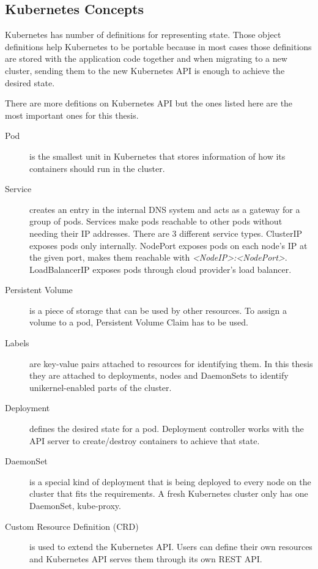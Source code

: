 \subsection*{Kubernetes Concepts}
Kubernetes has number of definitions for representing state. Those object definitions help Kubernetes to be portable because in most cases those definitions are stored with the application code together and when migrating to a new cluster, sending them to the new Kubernetes API is enough to achieve the desired state. 

There are more defitions on Kubernetes API but the ones listed here are the most important ones for this thesis.

\begin{description}
  \item [Pod] is the smallest unit in Kubernetes that stores information of how its containers should run in the cluster.
  \item [Service] creates an entry in the internal DNS system and acts as a gateway for a group of pods. Services make pods reachable to other pods without needing their IP addresses. There are 3 different service types. ClusterIP exposes pods only internally. NodePort exposes pods on each node's IP at the given port, makes them reachable with \textit{<NodeIP>:<NodePort>}. LoadBalancerIP exposes pods through cloud provider's load balancer.
  \item [Persistent Volume] is a piece of storage that can be used by other resources. To assign a volume to a pod, Persistent Volume Claim has to be used.
  \item [Labels] are key-value pairs attached to resources for identifying them. In this thesis they are attached to deployments, nodes and DaemonSets to identify unikernel-enabled parts of the cluster.
  \item [Deployment] defines the desired state for a pod. Deployment controller works with the API server to create/destroy containers to achieve that state.
  \item [DaemonSet] is a special kind of deployment that is being deployed to every node on the cluster that fits the requirements. A fresh Kubernetes cluster only has one DaemonSet, kube-proxy.
  \item [Custom Resource Definition (CRD)] is used to extend the Kubernetes API. Users can define their own resources and Kubernetes API serves them through its own REST API.
\end{description}

